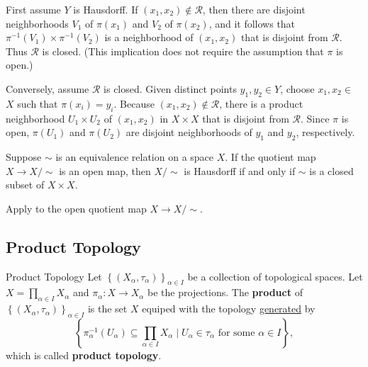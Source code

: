 \documentclass{report}
\begin{document}
\begin{prf}
	First assume $Y$ is Hausdorff. If $\left(x_1, x_2\right) \notin \mathcal{R}$, then there are disjoint neighborhoods $V_1$ of $\pi\left(x_1\right)$ and $V_2$ of $\pi\left(x_2\right)$, and it follows that $\pi^{-1}\left(V_1\right) \times \pi^{-1}\left(V_2\right)$ is a neighborhood of $\left(x_1, x_2\right)$ that is disjoint from $\mathcal{R}$. Thus $\mathcal{R}$ is closed. (This implication does not require the assumption that $\pi$ is open.)

	Conversely, assume $\mathcal{R}$ is closed. Given distinct points $y_1, y_2 \in Y$, choose $x_1, x_2 \in$ $X$ such that $\pi\left(x_i\right)=y_i$. Because $\left(x_1, x_2\right) \notin \mathcal{R}$, there is a product neighborhood $U_1 \times U_2$ of $\left(x_1, x_2\right)$ in $X \times X$ that is disjoint from $\mathcal{R}$. Since $\pi$ is open, $\pi\left(U_1\right)$ and $\pi\left(U_2\right)$ are disjoint neighborhoods of $y_1$ and $y_2$, respectively.
\end{prf}

\begin{corollary}{}{}
	Suppose $\sim$ is an equivalence relation on a space $X$. If the quotient map $X \rightarrow X / \sim$ is an open map, then $X / \sim$ is Hausdorff if and only if $\sim$ is a closed subset of $X \times X$.
\end{corollary}
\begin{prf}
	Apply  to the open quotient map $X \rightarrow X / \sim$.
\end{prf}

\subsection{Product Topology}
\begin{definition}{Product Topology}{}
	Let $\left\{(X_\alpha,\tau_\alpha)\right\}_{\alpha\in I}$ be a collection of topological spaces. Let $X=\prod_{\alpha\in I}X_\alpha$ and $\pi_\alpha:X\to X_\alpha$ be the projections. The \textbf{product} of $\left\{(X_\alpha,\tau_\alpha)\right\}_{\alpha\in I}$ is the set $X$ equiped with the topology \hyperref[th:generated_topology]{generated} by
	\[
		\left\{\pi_\alpha^{-1}(U_\alpha)\subseteq\prod_{\alpha\in I}X_\alpha\mid U_\alpha\in \tau_\alpha\text{ for some }\alpha\in I\right\},
	\]
	which is called \textbf{product topology}.
\end{definition}
\end{document}
